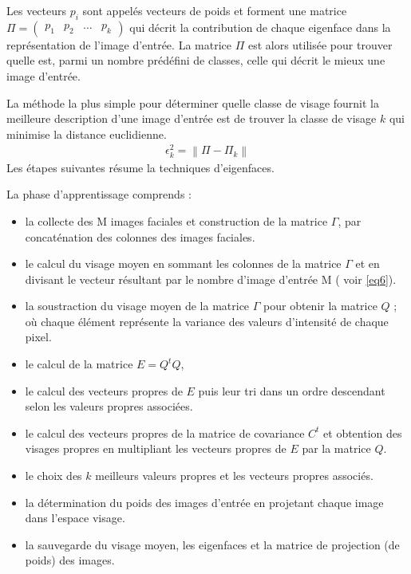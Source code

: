 Les  vecteurs $p_i$ sont  appelés  vecteurs  de  poids  et  forment  une  matrice 
$\Pi=\begin{pmatrix} p_1&p_2 &\ldots& p_k\end{pmatrix}$  qui  décrit  la  contribution  de  chaque  eigenface  dans  la  représentation  de l'image  d'entrée. La  matrice $\Pi$ est  alors  utilisée  pour  trouver  quelle  est,  parmi  un  nombre 
prédéfini de classes, celle qui décrit le mieux une image d'entrée.

La méthode la plus simple pour déterminer quelle classe de  visage fournit la meilleure
description d'une image d'entrée est de trouver la classe de visage $k$ qui minimise la distance euclidienne.
\begin{eqnarray}
\epsilon_k^2=\left\|\Pi-\Pi_k\right\|
\label{eq15}
\end{eqnarray}
Les étapes suivantes résume la techniques d'eigenfaces.

La phase d'apprentissage comprends :


\begin{itemize}
	\item [\textbullet] la collecte  des  M  images  faciales  et  construction  de  la  matrice  $\Gamma$, par concaténation des colonnes des images faciales. 
		\item [\textbullet]  le calcul du visage moyen en sommant les colonnes de la matrice $\Gamma$ et en divisant le vecteur résultant par le nombre d'image d'entrée M ( voir \ref{eq6}).
     \item [\textbullet] la soustraction du visage moyen de la matrice $\Gamma$ pour obtenir la matrice $Q$ ; où chaque élément représente la variance des valeurs d'intensité de chaque pixel.
		\item [\textbullet] le calcul de la matrice $E=Q^tQ$,
		\item [\textbullet] le calcul des vecteurs propres de $E$ puis leur tri dans un ordre descendant selon les valeurs propres associées.
		\item [\textbullet] le calcul  des  vecteurs  propres  de  la  matrice  de  covariance $C^t$  et  obtention  des  visages propres en multipliant les vecteurs propres de $E$ par la matrice $Q$.
		\item [\textbullet] le choix des $k$ meilleurs valeurs propres et les vecteurs propres associés.
		\item [\textbullet] la détermination du poids des images d'entrée en projetant chaque image dans l'espace
visage.
\item [\textbullet] la sauvegarde du visage moyen, les eigenfaces et la matrice de projection (de poids) des images.
\end{itemize}

